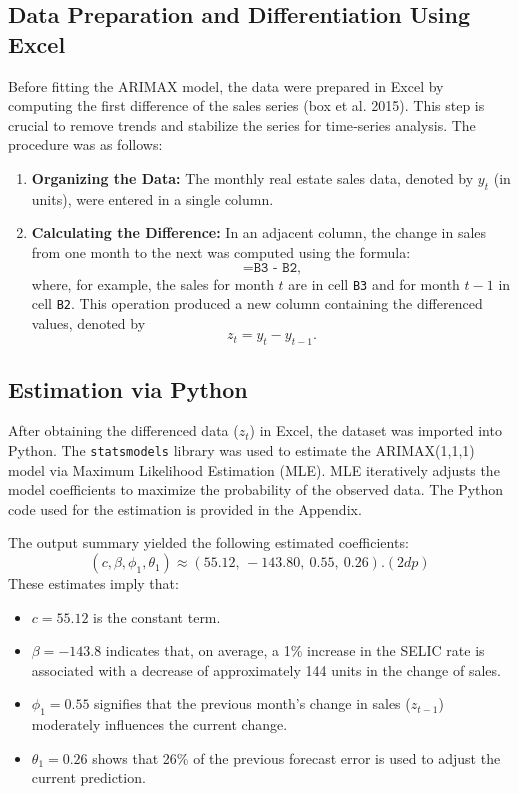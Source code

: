 \documentclass{article}
\begin{document}
\subsection{Data Preparation and Differentiation Using Excel}
Before fitting the ARIMAX model, the data were prepared in Excel by computing the first difference of the sales series (box et al. 2015). This step is crucial to remove trends and stabilize the series for time‐series analysis. The procedure was as follows:
\begin{enumerate}
    \item \textbf{Organizing the Data:} The monthly real estate sales data, denoted by \(y_t\) (in units), were entered in a single column.
    \item \textbf{Calculating the Difference:} In an adjacent column, the change in sales from one month to the next was computed using the formula:
    \[
    \texttt{=B3 - B2,}
    \]
    where, for example, the sales for month \(t\) are in cell \texttt{B3} and for month \(t-1\) in cell \texttt{B2}. This operation produced a new column containing the differenced values, denoted by
    \begin{equation}
    z_t = y_t - y_{t-1}.
    \end{equation}
\end{enumerate}

\subsection{Estimation via Python}
After obtaining the differenced data (\(z_t\)) in Excel, the dataset was imported into Python. The \texttt{statsmodels} library was used to estimate the ARIMAX(1,1,1) model via Maximum Likelihood Estimation (MLE). MLE iteratively adjusts the model coefficients to maximize the probability of the observed data. The Python code used for the estimation is provided in the Appendix. 


The output summary yielded the following estimated coefficients:
\[
(c,\beta,\phi_1,\theta_1) \approx (55.12,\,-143.80,\ 0.55,\ 0.26). (2dp)
\]
These estimates imply that:
\begin{itemize}
    \item \(c = 55.12\) is the constant term.
    \item \(\beta = -143.8\) indicates that, on average, a 1\% increase in the SELIC rate is associated with a decrease of approximately 144 units in the change of sales.
    \item \(\phi_1 = 0.55\) signifies that the previous month’s change in sales (\(z_{t-1}\)) moderately influences the current change.
    \item \(\theta_1 = 0.26\) shows that 26\% of the previous forecast error is used to adjust the current prediction.
\end{itemize}
\end{document}
